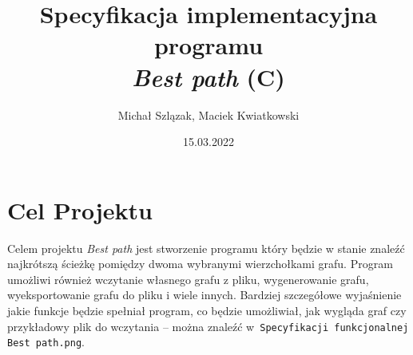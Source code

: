 \documentclass[12pt, a4paper]{article}
\begin{document}
\title{Specyfikacja implementacyjna programu\\ \textit{Best path} (C)}
\date{15.03.2022}
\author{Michał Szlązak, Maciek Kwiatkowski}
\maketitle
\tableofcontents
\thispagestyle{empty}
\cleardoublepage

\newpage

\setcounter{page}{1}

\section{Cel Projektu}
Celem projektu \textit{Best path} jest stworzenie programu który będzie w stanie znaleźć najkrótszą ścieżkę pomiędzy dwoma wybranymi wierzchołkami grafu. Program umożliwi również wczytanie własnego grafu z pliku, wygenerowanie grafu, wyeksportowanie grafu do pliku i wiele innych. Bardziej szczegółowe wyjaśnienie jakie funkcje będzie spełniał program, co będzie umożliwiał, jak wygląda graf czy przykładowy plik do wczytania -- można znaleźć w~\texttt{Specyfikacji funkcjonalnej Best path.png}.
\end{document}
